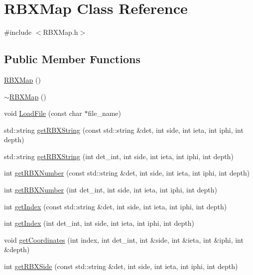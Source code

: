 \hypertarget{class_r_b_x_map}{}\section{R\+B\+X\+Map Class Reference}
\label{class_r_b_x_map}


{\ttfamily \#include $<$R\+B\+X\+Map.\+h$>$}

\subsection*{Public Member Functions}
\begin{DoxyCompactItemize}
\item 
\hyperlink{class_r_b_x_map_a7822668f9a21e2558ea64811dd118c23}{R\+B\+X\+Map} ()
\item 
\hyperlink{class_r_b_x_map_aedfc4123299d8fccdcfca471292c6987}{$\sim$\+R\+B\+X\+Map} ()
\item 
void \hyperlink{class_r_b_x_map_af3fdf4894114ad2d6c57daa583cb0b90}{Load\+File} (const char $\ast$file\+\_\+name)
\item 
std\+::string \hyperlink{class_r_b_x_map_a6b154cd399964d4c0dc8489e7b375bde}{get\+R\+B\+X\+String} (const std\+::string \&det, int side, int ieta, int iphi, int depth)
\item 
std\+::string \hyperlink{class_r_b_x_map_ae9384033134e77cd97274be8aaeb3354}{get\+R\+B\+X\+String} (int det\+\_\+int, int side, int ieta, int iphi, int depth)
\item 
int \hyperlink{class_r_b_x_map_a237829f569097abc76e08397e3af6779}{get\+R\+B\+X\+Number} (const std\+::string \&det, int side, int ieta, int iphi, int depth)
\item 
int \hyperlink{class_r_b_x_map_af2628ea187064667916e4689bbdb21be}{get\+R\+B\+X\+Number} (int det\+\_\+int, int side, int ieta, int iphi, int depth)
\item 
int \hyperlink{class_r_b_x_map_abd16cb8cdd63b73027c7a64f4b5054eb}{get\+Index} (const std\+::string \&det, int side, int ieta, int iphi, int depth)
\item 
int \hyperlink{class_r_b_x_map_a949c3c95750273116bccc9357da974b1}{get\+Index} (int det\+\_\+int, int side, int ieta, int iphi, int depth)
\item 
void \hyperlink{class_r_b_x_map_ab4e7c2bea4f53e9d6d1176e81042876c}{get\+Coordinates} (int index, int det\+\_\+int, int \&side, int \&ieta, int \&iphi, int \&depth)
\item 
int \hyperlink{class_r_b_x_map_af90edec96f81c29f20efa329db28eefe}{get\+R\+B\+X\+Side} (const std\+::string \&det, int side, int ieta, int iphi, int depth)

\end{DoxyCompactItemize}
